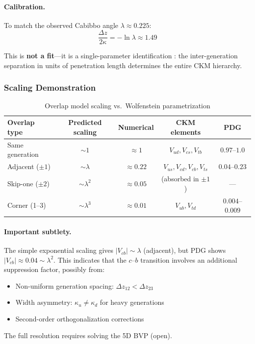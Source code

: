 \paragraph{Calibration.}
To match the observed Cabibbo angle $\lambda \approx 0.225$:
\begin{equation}
    \frac{\Delta z}{2\kappa} = -\ln\lambda \approx 1.49
    \label{eq:ch7_calibration}
\end{equation}

This is \textbf{not a fit}---it is a single-parameter identification \tagI{}:
the inter-generation separation in units of penetration length determines
the entire CKM hierarchy.

\subsubsection{Scaling Demonstration}

\begin{table}[ht]
\centering
\caption{Overlap model scaling vs.\ Wolfenstein parametrization}
\label{tab:ch7_overlap_scaling}
\begin{tabular}{lcccc}
\toprule
\textbf{Overlap type} & \textbf{Predicted scaling} & \textbf{Numerical} & \textbf{CKM elements} & \textbf{PDG} \\
\midrule
Same generation & $\sim 1$ & $\approx 1$ & $V_{ud}, V_{cs}, V_{tb}$ & $0.97$--$1.0$ \\
Adjacent ($\pm 1$) & $\sim \lambda$ & $\approx 0.22$ & $V_{us}, V_{cd}, V_{cb}, V_{ts}$ & $0.04$--$0.23$ \\
Skip-one ($\pm 2$) & $\sim \lambda^2$ & $\approx 0.05$ & (absorbed in $\pm 1$) & --- \\
Corner (1--3) & $\sim \lambda^3$ & $\approx 0.01$ & $V_{ub}, V_{td}$ & $0.004$--$0.009$ \\
\bottomrule
\end{tabular}
\end{table}

\paragraph{Important subtlety.}
The simple exponential scaling gives $|V_{cb}| \sim \lambda$ (adjacent), but
PDG shows $|V_{cb}| \approx 0.04 \sim \lambda^2$. This indicates that the
$c$--$b$ transition involves an additional suppression factor, possibly from:
\begin{itemize}[nosep]
    \item Non-uniform generation spacing: $\Delta z_{12} < \Delta z_{23}$
    \item Width asymmetry: $\kappa_u \neq \kappa_d$ for heavy generations
    \item Second-order orthogonalization corrections
\end{itemize}
The full resolution requires solving the 5D BVP (open).

